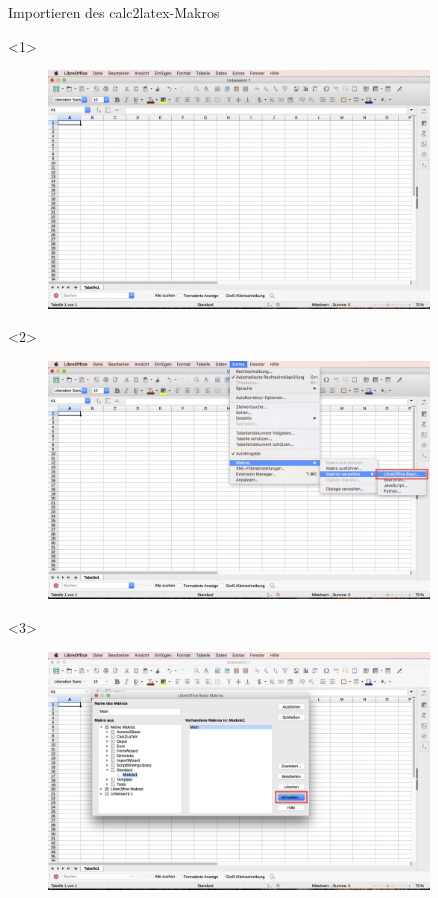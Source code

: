 \documentclass["WS\space 16-17\space -\space LaTeX-Kurs\space -\space Praesentation\space -\space 2.tex"]{subfiles}
\begin{document}
\begin{frame}[c]{Importieren des calc2latex-Makros}
	\begin{onlyenv}
		\begin{figure}[htbp]
			\centering
			\includegraphics[width=0.9\textwidth]{img/Bildschirmfoto_mitKasten/1_Importieren_Macro/1.jpg}
		\end{figure}
	\end{onlyenv}
	\begin{onlyenv}
		\begin{figure}[htbp]
			\centering
			\includegraphics[width=0.9\textwidth]{img/Bildschirmfoto_mitKasten/1_Importieren_Macro/2.jpg}
		\end{figure}
	\end{onlyenv}
	\begin{onlyenv}
		\begin{figure}[htbp]
			\centering
			\includegraphics[width=0.9\textwidth]{img/Bildschirmfoto_mitKasten/1_Importieren_Macro/3.jpg}

\end{figure}
\end{onlyenv}
\end{frame}
\end{document}
